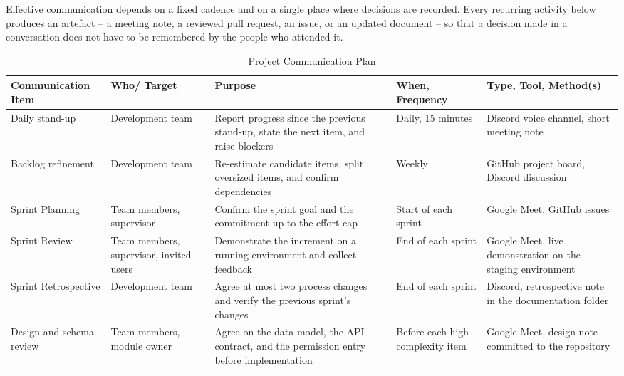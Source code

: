 Effective communication depends on a fixed cadence and on a single place where decisions are recorded. Every recurring activity below produces an artefact -- a meeting note, a reviewed pull request, an issue, or an updated document -- so that a decision made in a conversation does not have to be remembered by the people who attended it.

\begin{table}[H]
\centering
\caption{Project Communication Plan}
\label{tab:communication-plan}
\small
\setlength{\tabcolsep}{4pt}
\renewcommand{\arraystretch}{1.3}
\begin{tabular}{|L{3.0cm}|L{2.7cm}|L{3.9cm}|L{2.1cm}|L{2.7cm}|}
\hline
{}
\textbf{Communication Item} &
\textbf{Who/ Target} &
\textbf{Purpose} &
\textbf{When, Frequency} &
\textbf{Type, Tool, Method(s)} \\
\hline

Daily stand-up &
Development team &
Report progress since the previous stand-up, state the next item, and raise blockers &
Daily, 15 minutes &
Discord voice channel, short meeting note \\
\hline

Backlog refinement &
Development team &
Re-estimate candidate items, split oversized items, and confirm dependencies &
Weekly &
GitHub project board, Discord discussion \\
\hline

Sprint Planning &
Team members, supervisor &
Confirm the sprint goal and the commitment up to the effort cap &
Start of each sprint &
Google Meet, GitHub issues \\
\hline

Sprint Review &
Team members, supervisor, invited users &
Demonstrate the increment on a running environment and collect feedback &
End of each sprint &
Google Meet, live demonstration on the staging environment \\
\hline

Sprint Retrospective &
Development team &
Agree at most two process changes and verify the previous sprint's changes &
End of each sprint &
Discord, retrospective note in the documentation folder \\
\hline

Design and schema review &
Team members, module owner &
Agree on the data model, the API contract, and the permission entry before implementation &
Before each high-complexity item &
Google Meet, design note committed to the repository \\
\hline


\end{tabular}
\end{table}
